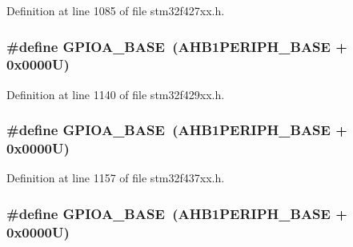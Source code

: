 Definition at line 1085 of file stm32f427xx.\+h.

\subsubsection[{\texorpdfstring{G\+P\+I\+O\+A\+\_\+\+B\+A\+SE}{GPIOA_BASE}}]{\setlength{\rightskip}{0pt plus 5cm}\#define G\+P\+I\+O\+A\+\_\+\+B\+A\+SE~({\bf A\+H\+B1\+P\+E\+R\+I\+P\+H\+\_\+\+B\+A\+SE} + 0x0000\+U)}\hypertarget{group___peripheral__memory__map_gad7723846cc5db8e43a44d78cf21f6efa}{}\label{group___peripheral__memory__map_gad7723846cc5db8e43a44d78cf21f6efa}


Definition at line 1140 of file stm32f429xx.\+h.

\subsubsection[{\texorpdfstring{G\+P\+I\+O\+A\+\_\+\+B\+A\+SE}{GPIOA_BASE}}]{\setlength{\rightskip}{0pt plus 5cm}\#define G\+P\+I\+O\+A\+\_\+\+B\+A\+SE~({\bf A\+H\+B1\+P\+E\+R\+I\+P\+H\+\_\+\+B\+A\+SE} + 0x0000\+U)}\hypertarget{group___peripheral__memory__map_gad7723846cc5db8e43a44d78cf21f6efa}{}\label{group___peripheral__memory__map_gad7723846cc5db8e43a44d78cf21f6efa}


Definition at line 1157 of file stm32f437xx.\+h.

\subsubsection[{\texorpdfstring{G\+P\+I\+O\+A\+\_\+\+B\+A\+SE}{GPIOA_BASE}}]{\setlength{\rightskip}{0pt plus 5cm}\#define G\+P\+I\+O\+A\+\_\+\+B\+A\+SE~({\bf A\+H\+B1\+P\+E\+R\+I\+P\+H\+\_\+\+B\+A\+SE} + 0x0000\+U)}\hypertarget{group___peripheral__memory__map_gad7723846cc5db8e43a44d78cf21f6efa}{}\label{group___peripheral__memory__map_gad7723846cc5db8e43a44d78cf21f6efa}


